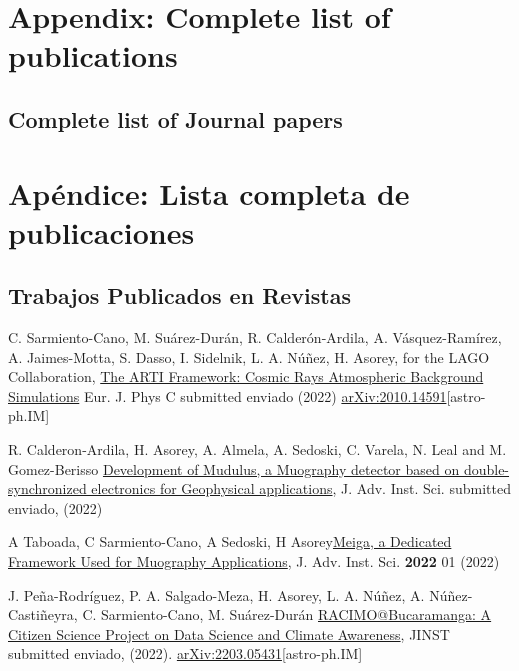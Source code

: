 \ifeng
\section*{Appendix: Complete list of publications}
\subsection*{Complete list of Journal papers}
\else
\section*{Apéndice: Lista completa de publicaciones}
\subsection*{Trabajos Publicados en Revistas}
\fi
\noindent
\begin{etaremune}

\item {} C. Sarmiento-Cano, M. Suárez-Durán, R. Calderón-Ardila, A. Vásquez-Ramírez, A. Jaimes-Motta, S. Dasso, I. Sidelnik, L. A. Núñez, H. Asorey, for the LAGO Collaboration, \href{}{The ARTI Framework: Cosmic Rays Atmospheric Background Simulations} Eur. J. Phys C \ifeng submitted \else enviado \fi (2022) \href{https://arxiv.org/abs/2010.14591}{arXiv:2010.14591}[astro-ph.IM]

\item {} R. Calderon-Ardila, H. Asorey, A. Almela, A. Sedoski, C. Varela, N. Leal and M. Gomez-Berisso \href{}{Development of Mudulus, a Muography detector based on
double-synchronized electronics for Geophysical applications}, J. Adv. Inst. Sci. \ifeng submitted \else enviado\fi, (2022)

\item {} A Taboada, C Sarmiento-Cano, A Sedoski, H Asorey\href{https://doi.org/10.31526/jais.2022.266}{Meiga, a Dedicated Framework Used for Muography Applications},  J. Adv. Inst. Sci. {\bf{2022}} 01 (2022) %

\item {} J. Peña-Rodríguez, P. A. Salgado-Meza, H. Asorey, L. A. Núñez, A. Núñez-Castiñeyra, C. Sarmiento-Cano, M. Suárez-Durán \href{}{RACIMO@Bucaramanga: A Citizen Science Project on Data Science and Climate Awareness}, JINST \ifeng submitted \else enviado\fi, (2022). \href{http://arxiv.org/abs/2203.05431}{arXiv:2203.05431}[astro-ph.IM]


\end{etaremune}
